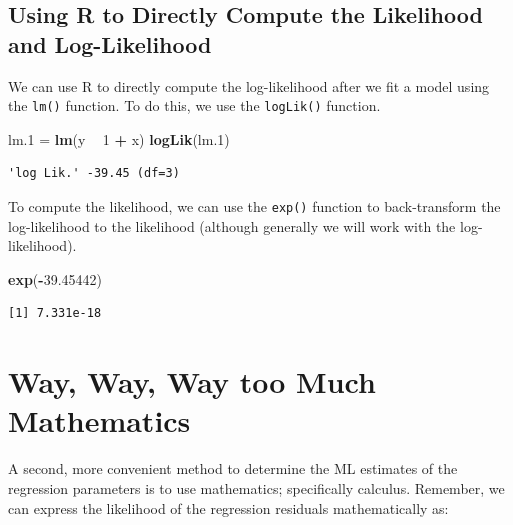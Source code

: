\documentclass[]{book}
\newenvironment{Shaded}{\begin{snugshade}}{\end{snugshade}}
\newcommand{\DecValTok}[1]{\textcolor[rgb]{0.00,0.00,0.81}{#1}}
\newcommand{\FloatTok}[1]{\textcolor[rgb]{0.00,0.00,0.81}{#1}}
\newcommand{\KeywordTok}[1]{\textcolor[rgb]{0.13,0.29,0.53}{\textbf{#1}}}
\newcommand{\NormalTok}[1]{#1}
\newcommand{\OperatorTok}[1]{\textcolor[rgb]{0.81,0.36,0.00}{\textbf{#1}}}
\newcommand{\StringTok}[1]{\textcolor[rgb]{0.31,0.60,0.02}{#1}}
\begin{document}
\hypertarget{using-r-to-directly-compute-the-likelihood-and-log-likelihood}{%
\subsection{Using R to Directly Compute the Likelihood and Log-Likelihood}\label{using-r-to-directly-compute-the-likelihood-and-log-likelihood}}

We can use R to directly compute the log-likelihood after we fit a model using the \texttt{lm()} function. To do this, we use the \texttt{logLik()} function.

\begin{Shaded}
\begin{Highlighting}[]
\NormalTok{lm}\FloatTok{.1}\NormalTok{ =}\StringTok{ }\KeywordTok{lm}\NormalTok{(y }\OperatorTok{~}\StringTok{ }\DecValTok{1} \OperatorTok{+}\StringTok{ }\NormalTok{x)}
\KeywordTok{logLik}\NormalTok{(lm}\FloatTok{.1}\NormalTok{)}
\end{Highlighting}
\end{Shaded}

\begin{verbatim}
'log Lik.' -39.45 (df=3)
\end{verbatim}

To compute the likelihood, we can use the \texttt{exp()} function to back-transform the log-likelihood to the likelihood (although generally we will work with the log-likelihood).

\begin{Shaded}
\begin{Highlighting}[]
\KeywordTok{exp}\NormalTok{(}\OperatorTok{-}\FloatTok{39.45442}\NormalTok{)}
\end{Highlighting}
\end{Shaded}

\begin{verbatim}
[1] 7.331e-18
\end{verbatim}

\hypertarget{way-too-much-math}{%
\section{Way, Way, Way too Much Mathematics}\label{way-too-much-math}}

A second, more convenient method to determine the ML estimates of the regression parameters is to use mathematics; specifically calculus. Remember, we can express the likelihood of the regression residuals mathematically as:
\end{document}
